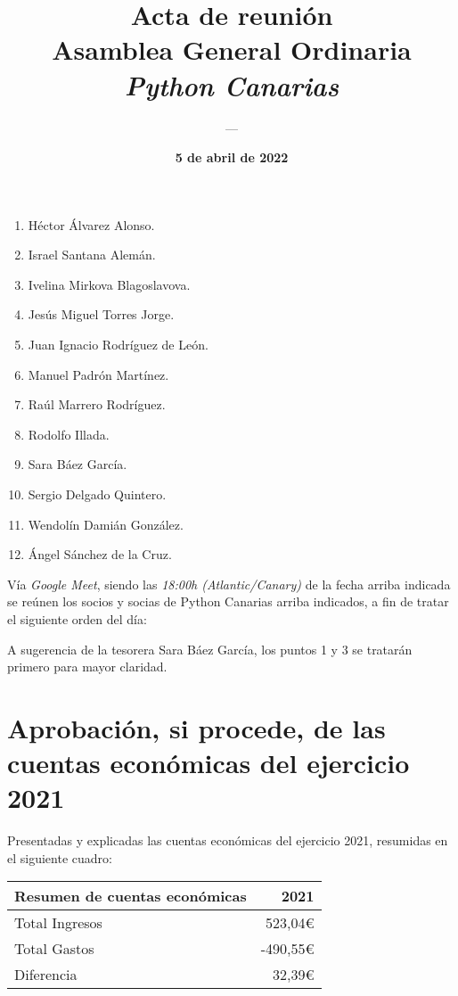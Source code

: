 \documentclass[a4paper,12pt]{article}
\title{\huge \textbf{Acta de reunión} \\ Asamblea General Ordinaria \\ \textit{Python Canarias}}
\date{\textbf{5 de abril de 2022}}
\author{---}
\begin{document}
\renewcommand{\contentsname}{Orden del día}

\maketitle

\begin{enumerate}
    \item Héctor Álvarez Alonso.
    \item Israel Santana Alemán.
    \item Ivelina Mirkova Blagoslavova.
    \item Jesús Miguel Torres Jorge.
    \item Juan Ignacio Rodríguez de León.
    \item Manuel Padrón Martínez.
    \item Raúl Marrero Rodríguez.
    \item Rodolfo Illada.
    \item Sara Báez García.
    \item Sergio Delgado Quintero.
    \item Wendolín Damián González.
    \item Ángel Sánchez de la Cruz.
\end{enumerate}

Vía \textit{Google Meet}, siendo las \textit{18:00h (Atlantic/Canary)} de la fecha arriba indicada se reúnen los socios y socias de Python Canarias arriba indicados, a fin de tratar el siguiente orden del día:

\tableofcontents

\vspace{1cm}

A sugerencia de la tesorera Sara Báez García, los puntos 1 y 3 se tratarán primero para mayor claridad.

\section{Aprobación, si procede, de las cuentas económicas del ejercicio 2021}

Presentadas y explicadas las cuentas económicas del ejercicio 2021, resumidas en el siguiente cuadro:

\begin{center}
    \begin{tabular}{ | l | r | }
        \hline
        \textbf{Resumen de cuentas económicas} & \textbf{2021} \\ 
        \hline
        Total Ingresos & 523,04\euro \\  
        \hline
        Total Gastos & -490,55\euro \\  
        \hline
        \hline
        Diferencia & 32,39\euro \\  
        \hline
    \end{tabular}
\end{center}
\end{document}
